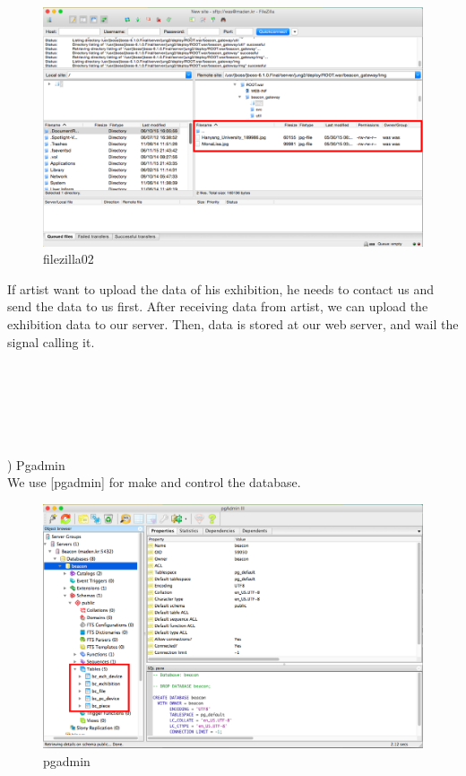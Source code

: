 \documentclass[conference]{IEEEtran}
\begin{document}
\begin{figure}[htbp]
\begin{center}
    \includegraphics[scale=0.2]{img_filezilla02}
    \caption{filezilla02} 
\end{center}
\end{figure}

If artist want to upload the data of his exhibition, he needs to contact us and send the data to us first. After receiving data from artist, we can upload the exhibition data to our server. Then, data is stored at our web server, and wail the signal calling it.\\\\\\\\\\\\\\

) Pgadmin \\

We use [pgadmin] for make and control the database. 
\begin{figure}[htbp]
\begin{center}
    \includegraphics[scale=0.2]{img_pgadmin01}
    \caption{pgadmin} 
\end{center}
\end{figure}
\end{document}
